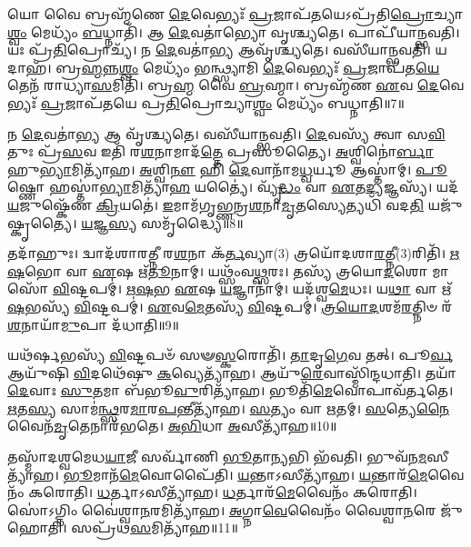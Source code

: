 𑌯𑍋 𑌵𑍈 𑌬𑍍𑌰𑌹𑍍𑌮᳴𑌣𑍇 \ul{𑌦𑍇}\-𑌵𑍇𑌭𑍍𑌯𑌃᳴ \ul{𑌪𑍍𑌰}\-𑌜𑌾𑌪᳴\-\ul{𑌤}\-𑌯𑍇\-𑌽𑌪𑍍𑌰᳴𑌤𑌿\-\ul{𑌪𑍍𑌰𑍋}\-𑌚𑍍𑌯𑌾\-\ul{𑌶𑍍𑌵𑌂} 𑌮𑍇𑌧𑍍𑌯𑌂᳴ \ul{𑌬}\-𑌧𑍍𑌨𑌾𑌤𑌿᳴।
𑌆 \ul{𑌦𑍇}\-𑌵𑌤𑌾॑𑌭𑍍𑌯𑍋 𑌵𑍃𑌶𑍍𑌚𑍍𑌯𑌤𑍇।
𑌪𑌾𑌪𑍀᳴𑌯𑌾𑌨𑍍𑌭𑌵𑌤𑌿।
𑌯𑌃 𑌪𑍍𑌰᳴\-\ul{𑌤𑌿}\-𑌪𑍍𑌰𑍋𑌚𑍍𑌯᳴।
𑌨 \ul{𑌦𑍇}\-𑌵𑌤𑌾॑\-\ul{𑌭𑍍𑌯} 𑌆𑌵𑍃᳴𑌶𑍍𑌚𑍍𑌯𑌤𑍇।
𑌵𑌸𑍀᳴𑌯𑌾𑌨𑍍𑌭𑌵𑌤𑌿।
𑌯𑌦𑌾𑌹᳴।
𑌬𑍍𑌰\-\ul{𑌹𑍍𑌮}\-𑌨𑍍𑌨\-\ul{𑌶𑍍𑌵𑌂} 𑌮𑍇𑌧𑍍𑌯𑌂᳴ 𑌭𑌨𑍍𑌥𑍍𑌸𑍍𑌯𑌾𑌮𑌿 \ul{𑌦𑍇}\-𑌵𑍇𑌭𑍍𑌯𑌃᳴ \ul{𑌪𑍍𑌰}\-𑌜𑌾𑌪᳴𑌤\-\ul{𑌯𑍇} 𑌤𑍇𑌨᳴ 𑌰𑌾𑌧𑍍𑌯𑌾\-\ul{𑌸}\-𑌮𑌿𑌤𑌿᳴।
𑌬𑍍𑌰\-\ul{𑌹𑍍𑌮} 𑌵𑍈 \ul{𑌬𑍍𑌰}\-𑌹𑍍𑌮𑌾।
𑌬𑍍𑌰𑌹𑍍𑌮᳴𑌣 \ul{𑌏}\-𑌵 \ul{𑌦𑍇}\-𑌵𑍇𑌭𑍍𑌯𑌃᳴ \ul{𑌪𑍍𑌰}\-𑌜𑌾𑌪᳴𑌤𑌯𑍇 𑌪𑍍𑌰\-\ul{𑌤𑌿}\-𑌪𑍍𑌰𑍋𑌚𑍍𑌯𑌾\-\ul{𑌶𑍍𑌵𑌂} 𑌮𑍇𑌧𑍍𑌯𑌂᳴ 𑌬𑌧𑍍𑌨𑌾𑌤𑌿॥7॥

𑌨 \ul{𑌦𑍇}\-𑌵𑌤𑌾॑\-\ul{𑌭𑍍𑌯} 𑌆 𑌵𑍃᳴𑌶𑍍𑌚𑍍𑌯𑌤𑍇।
𑌵𑌸𑍀᳴𑌯𑌾𑌨𑍍𑌭𑌵𑌤𑌿।
\-\ul{𑌦𑍇}\-𑌵𑌸𑍍𑌯᳴ 𑌤𑍍𑌵𑌾 𑌸\-\ul{𑌵𑌿}\-𑌤𑍁𑌃 𑌪𑍍𑌰᳴\-\ul{𑌸}\-𑌵 𑌇𑌤𑌿᳴ 𑌰\-\ul{𑌶}\-𑌨𑌾𑌮𑌾𑌦᳴\-\ul{𑌤𑍍𑌤𑍇} 𑌪𑍍𑌰𑌸𑍂॑𑌤𑍍𑌯𑍈।
\-\ul{𑌅}\-𑌶𑍍𑌵𑌿𑌨𑍋॑\-\ul{𑌰𑍍𑌬𑌾}\-𑌹𑍁\-\ul{𑌭𑍍𑌯𑌾}\-𑌮𑌿𑌤𑍍𑌯𑌾᳴𑌹।
\-\ul{𑌅}\-𑌶𑍍𑌵𑌿\-\ul{𑌨𑍗} 𑌹𑌿 \ul{𑌦𑍇}\-𑌵𑌾𑌨𑌾᳴𑌮\-\ul{𑌧𑍍𑌵}\-𑌰𑍍𑌯𑍂 𑌆𑌸𑍍𑌤𑌾॑𑌮𑍍।
\-\ul{𑌪𑍂}\-𑌷𑍍𑌣𑍋 𑌹𑌸𑍍𑌤𑌾॑\-\ul{𑌭𑍍𑌯𑌾}\-𑌮𑌿𑌤𑍍𑌯𑌾᳴\-\ul{𑌹} 𑌯𑌤𑍍𑌯𑍈॑।
𑌵𑍍𑌯𑍃᳴\-\ul{𑌦𑍍𑌧𑌂} 𑌵𑌾 \ul{𑌏}\-𑌤\-\ul{𑌦𑍍𑌯}\-𑌜𑍍𑌞𑌸𑍍𑌯᳴।
𑌯𑌦᳴\-\ul{𑌯}\-𑌜𑍁𑌷𑍍𑌕𑍇᳴𑌣 \ul{𑌕𑍍𑌰𑌿}\-𑌯𑌤𑍇॑।
\-\ul{𑌇}\-𑌮𑌾𑌮᳴𑌗𑍃𑌭𑍍𑌣𑌨𑍍𑌰\-\ul{𑌶}\-𑌨𑌾\-\ul{𑌮𑍃}\-𑌤𑌸𑍍𑌯𑍇\-𑌤𑍍𑌯𑌧𑌿᳴ 𑌵𑌦\-\ul{𑌤𑌿} 𑌯𑌜𑍁᳴𑌷𑍍𑌕𑍃𑌤𑍍𑌯𑍈।
\-\ul{𑌯}\-𑌜𑍍𑌞\-\ul{𑌸𑍍𑌯} 𑌸𑌮𑍃᳴𑌦𑍍𑌧𑍍𑌯𑍈॥8॥

𑌤𑌦𑌾᳴𑌹𑍁𑌃।
𑌦𑍍𑌵𑌾𑌦᳴𑌶𑌾𑌰𑌤𑍍𑌨𑍀 𑌰\-\ul{𑌶}\-𑌨𑌾 𑌕᳴\-\ul{𑌰𑍍𑌤}\-𑌵𑍍𑌯𑌾(3) 𑌤𑍍𑌰𑌯𑍋᳴𑌦𑌶𑌾\-\ul{𑌰}\-𑌤𑍍𑌨𑍀(3)\-𑌰𑌿𑌤𑌿᳴।
\-\ul{𑌋}\-\-\ul{𑌷}\-𑌭𑍋 𑌵𑌾 \ul{𑌏}\-𑌷 𑌋᳴\-\ul{𑌤𑍂}\-𑌨𑌾𑌮𑍍।
𑌯𑌥𑍍𑌸𑌂᳴𑌵\-\ul{𑌥𑍍𑌸}\-𑌰𑌃।
𑌤𑌸𑍍𑌯᳴ 𑌤𑍍𑌰𑌯𑍋\-\ul{𑌦}\-𑌶𑍋 𑌮𑌾𑌸𑍋᳴ \ul{𑌵𑌿}\-𑌷𑍍𑌟𑌪𑌮𑍍॑।
\-\ul{𑌋}\-\-\ul{𑌷}\-𑌭 \ul{𑌏}\-𑌷 \ul{𑌯}\-𑌜𑍍𑌞𑌾𑌨𑌾॑𑌮𑍍।
𑌯𑌦᳴𑌶𑍍𑌵\-\ul{𑌮𑍇}\-𑌧𑌃।
𑌯\-\ul{𑌥𑌾} 𑌵𑌾 𑌋᳴\-\ul{𑌷}\-𑌭𑌸𑍍𑌯᳴ \ul{𑌵𑌿}\-𑌷𑍍𑌟𑌪𑌮𑍍॑।
\-\ul{𑌏}\-𑌵\-\ul{𑌮𑍇}\-𑌤𑌸𑍍𑌯᳴ \ul{𑌵𑌿}\-𑌷𑍍𑌟𑌪𑌮𑍍॑।
\-\ul{𑌤𑍍𑌰}\-\-\ul{𑌯𑍋}\-\-\ul{𑌦}\-𑌶𑌮᳴\-\ul{𑌰}\-𑌤𑍍𑌨𑌿𑍞 𑌰᳴\-\ul{𑌶}\-𑌨𑌾𑌯𑌾᳴\-\ul{𑌮𑍁}\-𑌪𑌾 𑌦᳴𑌧𑌾𑌤𑌿॥9॥

𑌯𑌥᳴𑌰𑍍\mbox{}\-\ul{𑌷}\-𑌭𑌸𑍍𑌯᳴ \ul{𑌵𑌿}\-𑌷𑍍𑌟𑌪𑍞᳴ 𑌸𑍟\-\ul{𑌸𑍍𑌕}\-𑌰𑍋𑌤𑌿᳴।
\-\ul{𑌤𑌾}\-𑌦𑍃\-\ul{𑌗𑍇}\-𑌵 𑌤𑌤𑍍।
𑌪𑍂\-\ul{𑌰𑍍𑌵} 𑌆𑌯𑍁᳴𑌷𑌿 \ul{𑌵𑌿}\-𑌦𑌥𑍇᳴𑌷𑍁 \ul{𑌕}\-𑌵𑍍𑌯𑍇𑌤𑍍𑌯𑌾᳴𑌹।
𑌆𑌯𑍁᳴\-\ul{𑌰𑍇}\-𑌵𑌾𑌸𑍍𑌮𑌿᳴𑌨𑍍𑌦𑌧𑌾𑌤𑌿।
𑌤𑌯𑌾᳴ \ul{𑌦𑍇}\-𑌵𑌾𑌃 \ul{𑌸𑍁}\-𑌤𑌮𑌾 𑌬᳴𑌭𑍂\-\ul{𑌵𑍁}\-𑌰𑌿𑌤𑍍𑌯𑌾᳴𑌹।
𑌭𑍂𑌤𑌿᳴\-\ul{𑌮𑍇}\-𑌵𑍋𑌪𑌾𑌵᳴𑌰𑍍𑌤𑌤𑍇।
\-\ul{𑌋}\-𑌤\-\ul{𑌸𑍍𑌯} 𑌸𑌾𑌮॑\-\ul{𑌨𑍍𑌥𑍍𑌸}\-𑌰\-\ul{𑌮𑌾}\-𑌰\-\ul{𑌪}\-𑌨𑍍𑌤𑍀𑌤𑍍𑌯𑌾᳴𑌹।
\-\ul{𑌸}\-𑌤𑍍𑌯𑌂 𑌵𑌾 \ul{𑌋}\-𑌤𑌮𑍍।
\-\ul{𑌸}\-𑌤𑍍𑌯𑍇\-\ul{𑌨𑍈}\-𑌵𑍈𑌨᳴\-\ul{𑌮𑍃}\-𑌤𑍇𑌨𑌾𑌰᳴𑌭𑌤𑍇।
\-\ul{𑌅}\-\-\ul{𑌭𑌿}\-𑌧𑌾 \ul{𑌅}\-𑌸𑍀𑌤𑍍𑌯𑌾᳴𑌹॥10॥

𑌤𑌸𑍍𑌮𑌾᳴𑌦𑌶𑍍𑌵𑌮𑍇𑌧\-\ul{𑌯𑌾}\-𑌜𑍀 𑌸𑌰𑍍𑌵𑌾᳴𑌣𑌿 \ul{𑌭𑍂}\-𑌤𑌾\-\ul{𑌨𑍍𑌯}\-𑌭𑌿 𑌭᳴𑌵𑌤𑌿।
𑌭𑍁𑌵᳴𑌨\-\ul{𑌮}\-𑌸𑍀\-𑌤𑍍𑌯𑌾᳴𑌹।
\-\ul{𑌭𑍂}\-𑌮𑌾𑌨᳴\-\ul{𑌮𑍇}\-𑌵𑍋𑌪𑍈᳴𑌤𑌿।
\-\ul{𑌯}\-𑌨𑍍𑌤𑌾\-𑌽𑌸𑍀𑌤𑍍𑌯𑌾᳴𑌹।
\-\ul{𑌯}\-𑌨𑍍𑌤𑌾𑌰᳴\-\ul{𑌮𑍇}\-𑌵𑍈𑌨𑌂᳴ 𑌕𑌰𑍋𑌤𑌿।
\-\ul{𑌧}\-𑌰𑍍𑌤𑌾𑌽𑌸𑍀𑌤𑍍𑌯𑌾᳴𑌹।
\-\ul{𑌧}\-𑌰𑍍𑌤𑌾𑌰᳴\-\ul{𑌮𑍇}\-𑌵𑍈𑌨𑌂᳴ 𑌕𑌰𑍋𑌤𑌿।
𑌸𑍋॑𑌽𑌗𑍍𑌨𑌿𑌂 𑌵𑍈॑𑌶𑍍𑌵𑌾\-\ul{𑌨}\-𑌰𑌮𑌿𑌤𑍍𑌯𑌾᳴𑌹।
\-\ul{𑌅}\-𑌗𑍍𑌨𑌾\-\ul{𑌵𑍇}\-𑌵𑍈𑌨𑌂᳴ 𑌵𑍈𑌶𑍍𑌵𑌾\-\ul{𑌨}\-𑌰𑍇 𑌜𑍁᳴𑌹𑍋𑌤𑌿।
𑌸𑌪𑍍𑌰᳴𑌥\-\ul{𑌸}\-𑌮𑌿𑌤𑍍𑌯𑌾᳴𑌹॥11॥

